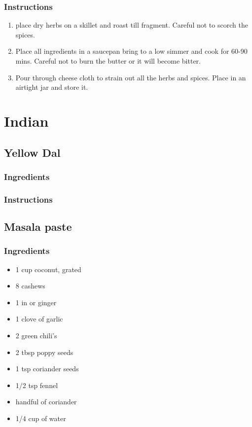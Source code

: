 \documentclass[11pt]{article}
\begin{document}
\subsubsection*{Instructions}
\label{sec:org06558bc}
\begin{enumerate}
\item place dry herbs on a skillet and roast till fragment. Careful not to scorch the spices.
\item Place all ingredients in a saucepan bring to a low simmer and cook for 60-90 mins. Careful not to burn the butter or it will become bitter.
\item Pour through cheese cloth to strain out all the herbs and spices. Place in an airtight jar and store it.
\end{enumerate}
\section{Indian}
\label{sec:orgd2e2248}
\subsection{Yellow Dal}
\label{sec:orgcde2acd}
\subsubsection*{Ingredients}
\label{sec:org003cc2e}
\subsubsection*{Instructions}
\label{sec:org90606aa}
\subsection{Masala paste}
\label{sec:org48049ea}
\subsubsection*{Ingredients}
\label{sec:org7a4941c}
\begin{itemize}
\item 1 cup coconut, grated
\item 8 cashews
\item 1 in or ginger
\item 1 clove of garlic
\item 2 green chili's
\item 2 tbsp poppy seeds
\item 1 tsp coriander seeds
\item 1/2 tsp fennel
\item handful of coriander
\item 1/4 cup of water
\end{itemize}
\end{document}
